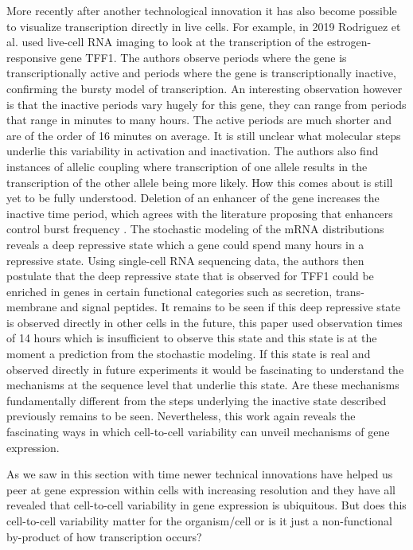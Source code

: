 More recently after another technological innovation it has also become possible to visualize transcription directly in live cells. For example, in 2019 Rodriguez et al. \cite{rodriguez_intrinsic_2019} used live-cell RNA imaging to look at the transcription of the estrogen-responsive gene TFF1. The authors observe periods where the gene is transcriptionally active and periods where the gene is transcriptionally inactive, confirming the bursty model of transcription. An interesting observation however is that the inactive periods vary hugely for this gene, they can range from periods that range in minutes to many hours. The active periods are much  shorter and are of the order of 16 minutes on average. It is still unclear what molecular steps underlie this variability in activation and inactivation. The authors also find instances of allelic coupling where transcription of one allele results in the transcription of the other allele being more likely. How this comes about is still yet to be fully understood. Deletion of an enhancer of the gene increases the inactive time period, which agrees with the literature proposing that enhancers control burst frequency \cite{larsson2019n}. The stochastic modeling of the mRNA distributions reveals a deep repressive state  which a gene could spend many hours in a repressive state. Using single-cell RNA sequencing data, the authors then postulate that the deep repressive state that is observed for TFF1 could be enriched in genes in certain functional categories such as secretion, trans-membrane and signal peptides. It remains to be seen if this deep repressive state is observed directly in other cells in the future, this paper used observation times of 14 hours which is insufficient to observe this state and this state is at the moment a prediction from the stochastic modeling. If this state is real and observed directly in future experiments it would be fascinating to understand the mechanisms at the sequence level that underlie this state. Are these mechanisms fundamentally different from the steps underlying the inactive state described previously remains to be seen. Nevertheless, this work again reveals the fascinating ways in which cell-to-cell variability can unveil mechanisms of gene expression.

As we saw in this section with time newer technical innovations have helped us peer at gene expression within cells with increasing resolution and they have all revealed that cell-to-cell variability in gene expression is ubiquitous. But does this cell-to-cell variability matter for the organism/cell or is it just a non-functional by-product of how transcription occurs?


